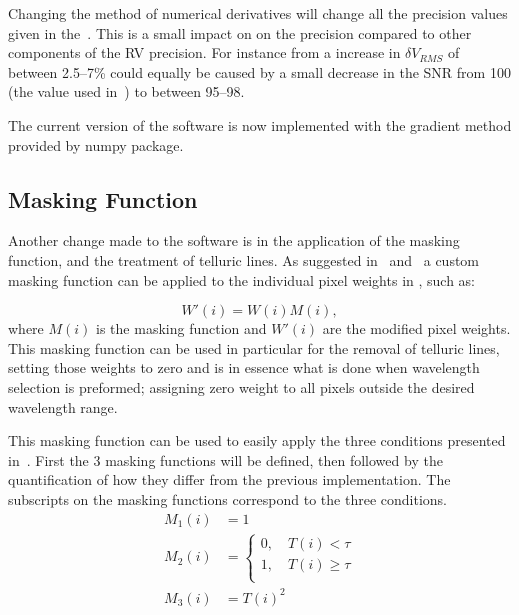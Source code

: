 Changing the method of numerical derivatives will change all the precision values given in the~\citet{figueira_radial_2016}. This is a small impact on on the precision compared to other components of the RV precision. For instance from  a increase in \(\delta V_{RMS}\) of between 2.5--7\%  could equally be caused by a small decrease in the SNR from 100 (the value used in~\citet{figueira_radial_2016}) to between 95--98.

The current version of the software is now implemented with the gradient method provided by numpy package.

\subsection{Masking Function}
\label{subsec:masking_function}
Another change made to the software is in the application of the masking function, and the treatment of telluric lines. As suggested in~\cite{Connes1985} and~\cite{bouchy_fundamental_2001} a custom masking function can be applied to the individual pixel weights in , such as:

\[W'(i) = W(i)M(i),\label{eq:mask_function}\] where \(M(i)\) is the masking function and \(W'(i)\) are the modified pixel weights.
This masking function can be used in particular for the removal of telluric lines, setting those weights to zero and is in essence what is done when wavelength selection is preformed; assigning zero weight to all pixels outside the desired wavelength range.

This masking function can be used to easily apply the three conditions presented in~\citet{figueira_radial_2016}. First  the 3 masking functions will be defined, then followed by the quantification of how they differ from the previous implementation. The subscripts on the masking functions correspond to the three conditions.
\begin{align}
M_1(i) &= 1 \label{eq:mask1}\\
M_2(i) &= \begin{cases}
0, \hspace{1em} T(i) < \tau\\
1, \hspace{1em} T(i) \ge \tau\\
\end{cases}\label{eq:mask2}\\
M_3(i) &= {T(i)}^{2} \label{eq:mask3}
\end{align}

